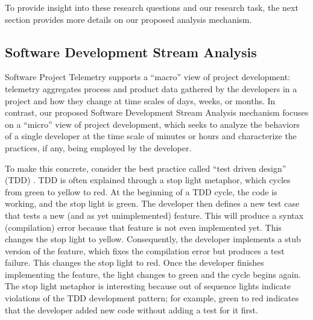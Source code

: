 To provide insight into these research questions and our research task, the
next section provides more details on our proposed analysis mechanism.

\subsection{Software Development Stream Analysis}

Software Project Telemetry supports a ``macro'' view of project
development: telemetry aggregates process and product data gathered by the
developers in a project and how they change at time scales of days, weeks,
or months.  In contrast, our proposed Software Development Stream Analysis
mechanism focuses on a ``micro'' view of project development, which seeks
to analyze the behaviors of a single developer at the time scale of minutes
or hours and characterize the practices, if any, being employed by the
developer.

To make this concrete, consider the best practice called ``test driven
design'' (TDD) \cite{Beck03}.  TDD is often explained through a stop light
metaphor, which cycles from green to yellow to red.  At the beginning of a
TDD cycle, the code is working, and the stop light is green.  The developer
then defines a new test case that tests a new (and as yet unimplemented)
feature.  This will produce a syntax (compilation) error because that
feature is not even implemented yet.  This changes the stop light to
yellow.  Consequently, the developer implements a stub version of the
feature, which fixes the compilation error but produces a test failure.
This changes the stop light to red. Once the developer finishes
implementing the feature, the light changes to green and the cycle begins
again.  The stop light metaphor is interesting because out of sequence
lights indicate violations of the TDD development pattern; for example,
green to red indicates that the developer added new code without adding a
test for it first.


